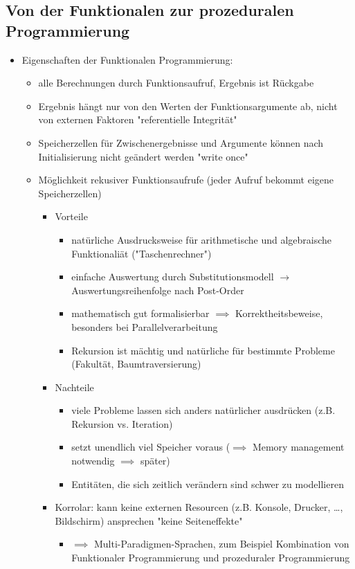 \documentclass[a4paper]{scrartcl}
\theoremstyle{definition}
\theoremstyle{plain}
\theoremstyle{remark}
\theoremstyle{remark}
\begin{document}
\subsection{Von der Funktionalen zur prozeduralen Programmierung}
\label{sec-7-1}
\begin{itemize}
\item Eigenschaften der Funktionalen Programmierung:
\begin{itemize}
\item alle Berechnungen durch Funktionsaufruf, Ergebnis ist Rückgabe
\item Ergebnis hängt nur von den Werten der Funktionsargumente ab, nicht von externen Faktoren "referentielle Integrität"
\item Speicherzellen für Zwischenergebnisse und Argumente können nach Initialisierung nicht geändert werden "write once"
\item Möglichkeit rekusiver Funktionsaufrufe (jeder Aufruf bekommt eigene Speicherzellen)
\begin{itemize}
\item Vorteile
\begin{itemize}
\item natürliche Ausdrucksweise für arithmetische und algebraische Funktionaliät ("Taschenrechner")
\item einfache Auswertung durch Substitutionsmodell $\rightarrow$ Auswertungsreihenfolge nach Post-Order
\item mathematisch gut formalisierbar $\implies$ Korrektheitsbeweise, besonders bei Parallelverarbeitung
\item Rekursion ist mächtig und natürliche für bestimmte Probleme (Fakultät, Baumtraversierung)
\end{itemize}
\item Nachteile
\begin{itemize}
\item viele Probleme lassen sich anders natürlicher ausdrücken (z.B. Rekursion vs. Iteration)
\item setzt unendlich viel Speicher voraus ($\implies$ Memory management notwendig $\implies$ später)
\item Entitäten, die sich zeitlich verändern sind schwer zu modellieren
\end{itemize}
\item Korrolar: kann keine externen Resourcen (z.B. Konsole, Drucker, \ldots, Bildschirm) ansprechen "keine Seiteneffekte"
\begin{itemize}
\item $\implies$ Multi-Paradigmen-Sprachen, zum Beispiel Kombination von Funktionaler Programmierung und prozeduraler Programmierung
\end{itemize}
\end{itemize}
\end{itemize}
\end{itemize}
\end{document}
